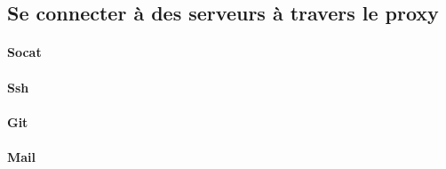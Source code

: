 \subsection{Se connecter à des serveurs à travers le proxy}

\paragraph{Socat}

\paragraph{Ssh}

\paragraph{Git}

\paragraph{Mail}

